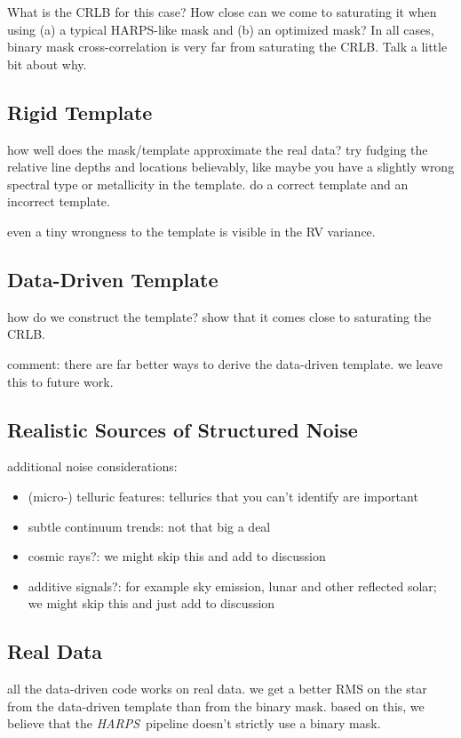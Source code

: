 \documentclass[modern]{aastex63}
\newcommand{\acronym}[1]{{\small{#1}}}
\newcommand{\project}[1]{\textsl{#1}}
\newcommand{\HARPS}{\project{\acronym{HARPS}}}
\begin{document}
What is the CRLB for this case? How close can we come to saturating it when using (a) a typical HARPS-like mask and (b) an optimized mask? In all cases, binary mask cross-correlation is very far from saturating the CRLB. Talk a little bit about why.

\subsection{Rigid Template}

how well does the mask/template approximate the real data? try fudging the relative line depths and locations believably, like maybe you have a slightly wrong spectral type or metallicity in the template. do a correct template and an incorrect template.

even a tiny wrongness to the template is visible in the RV variance.

\subsection{Data-Driven Template}

how do we construct the template? show that it comes close to saturating the CRLB.

comment: there are far better ways to derive the data-driven template. we leave this to future work.

\subsection{Realistic Sources of Structured Noise}

additional noise considerations:
\begin{itemize}
\item (micro-) telluric features: tellurics that you can't identify are important
\item subtle continuum trends: not that big a deal
\item cosmic rays?: we might skip this and add to discussion
\item additive signals?: for example sky emission, lunar and other reflected solar; we might skip this and just add to discussion
\end{itemize}

\subsection{Real Data}

all the data-driven code works on real data. we get a better RMS on the star from the data-driven template than from the binary mask. based on this, we believe that the \HARPS\ pipeline doesn't strictly use a binary mask.
\end{document}

